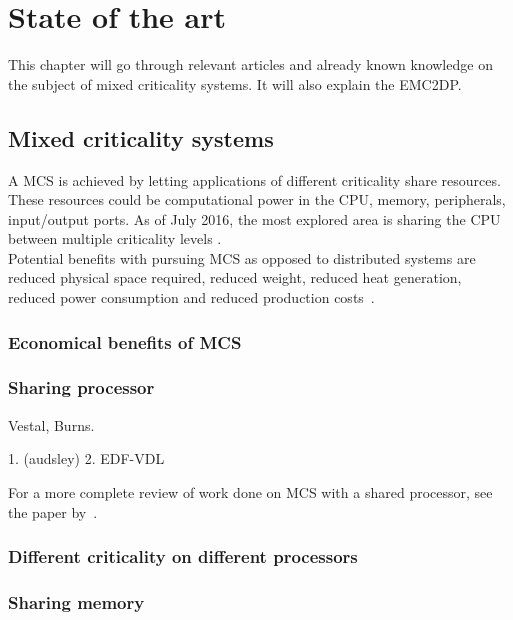 \chapter{State of the art}
This chapter will go through relevant articles and already known knowledge on the subject of mixed criticality systems. It will also explain the EMC2DP.

\section{Mixed criticality systems}
A MCS is achieved by letting applications of different criticality share resources. These resources could be computational power in the CPU, memory, peripherals, input/output ports. As of July 2016, the most explored area is sharing the CPU between multiple criticality levels \cite{burns2016}. \\

Potential benefits with pursuing MCS as opposed to distributed systems are reduced physical space required, reduced weight, reduced heat generation, reduced power consumption and reduced production costs~\cite{burns2016}. %

\subsection{Economical benefits of MCS}

\subsection{Sharing processor}
Vestal, Burns.

1. (audsley) 2. EDF-VDL

For a more complete review of work done on MCS with a shared processor, see the paper by~\cite{burns2016}.

\subsection{Different criticality on different processors}


\subsection{Sharing memory}

